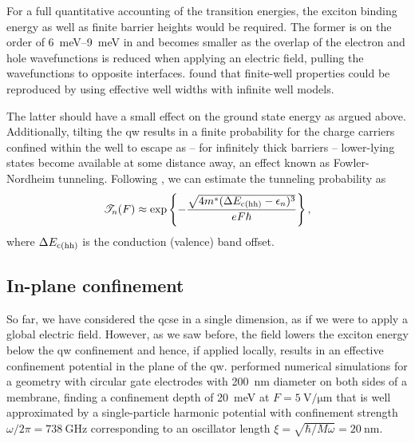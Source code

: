 For a full quantitative accounting of the transition energies, the exciton binding energy as well as finite barrier heights would be required.
The former is on the order of \qtyrange{6}{9}{\milli\electronvolt} in  and becomes smaller as the overlap of the electron and hole wavefunctions is reduced when applying an electric field, pulling the wavefunctions to opposite interfaces.
 found that finite-well properties could be reproduced by using effective well widths with infinite well models.

The latter should have a small effect on the ground state energy as argued above.
Additionally, tilting the \gls{qw} results in a finite probability for the charge carriers confined within the well to escape as -- for infinitely thick barriers -- lower-lying states become available at some distance away, an effect known as Fowler-Nordheim tunneling.
Following , we can estimate the tunneling probability as
\begin{equation}
    \mathscr{T}_n(F) \approx \exp\left\lbrace -\frac{\sqrt{4 m^\ast (\Delta E_{\mathrm{c}(\mathrm{hh})} - \epsilon_n)^3}}{e F\hbar}\right\rbrace,
\end{equation}
where $\Delta E_{\mathrm{c}(\mathrm{hh})}$ is the conduction (valence) band offset.

\subsection{In-plane confinement}\label{subsec:exp:theory:qcse:trap}
So far, we have considered the \gls{qcse} in a single dimension, as if we were to apply a global electric field.
However, as we saw before, the field lowers the exciton energy below the \gls{qw} confinement and hence, if applied locally, results in an effective confinement potential in the plane of the \gls{qw}.
\citet{Descamps2021} performed numerical simulations for a geometry with circular gate electrodes with \qty{200}{\nano\meter} diameter on both sides of a membrane, finding a confinement depth of \qty{20}{\milli\electronvolt} at $F=\qty{5}{\volt\per\micro\meter}$ that is well approximated by a single-particle harmonic potential with confinement strength $\omega/2\pi = \qty{738}{\giga\hertz}$ corresponding to an oscillator length $\xi=\sqrt{\hbar/M\omega}=\qty{20}{\nano\meter}$.


